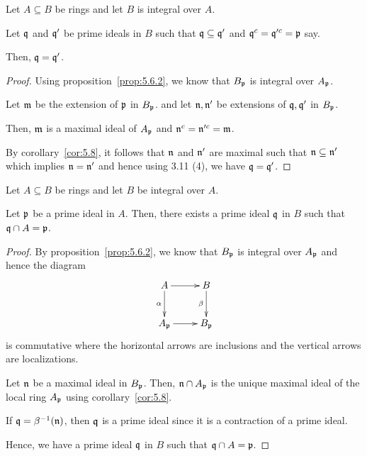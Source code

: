 \begin{corollary}{}{}
	Let \(A \subseteq B\) be rings and let \(B\) is integral over \(A\).

	Let \(\mathfrak{q}\) and \(\mathfrak{q}'\) be prime ideals in \(B\) such that
	\(\mathfrak{q} \subseteq \mathfrak{q}'\) and \(\mathfrak{q}^c = \mathfrak{q}'^c = \mathfrak{p}\) say.

	Then, \(\mathfrak{q} = \mathfrak{q}'\).
\end{corollary}
\begin{proof}
	Using proposition~\ref{prop:5.6.2}, we know that \(B_{\mathfrak{p}}\) is
	integral over \(A_{\mathfrak{p}}\).

	Let \(\mathfrak{m}\) be the extension of \(\mathfrak{p}\) in \(B_{\mathfrak{p}}\).
	and let \(\mathfrak{n}, \mathfrak{n}'\) be extensions of \(\mathfrak{q}, \mathfrak{q}'\) in
	\(B_{\mathfrak{p}}\).

	Then, \(\mathfrak{m}\) is a maximal ideal of \(A_{\mathfrak{p}}\) and
	\(\mathfrak{n}^c = \mathfrak{n}'^c = \mathfrak{m}\).

	By corollary~\ref{cor:5.8}, it follows that \(\mathfrak{n}\) and \(\mathfrak{n}'\)
	are maximal such that \(\mathfrak{n} \subseteq \mathfrak{n}'\) which implies
	\(\mathfrak{n} = \mathfrak{n}'\) and hence using 3.11 (4), we have
	\(\mathfrak{q} = \mathfrak{q}'\).
\end{proof}


\begin{theorem}{}{}
\label{thm:5.10}
	Let \(A \subseteq B\) be rings and let \(B\) be integral over \(A\).

	Let \(\mathfrak{p}\) be a prime ideal in \(A\).
	Then, there exists a prime ideal \(\mathfrak{q}\) in \(B\) such that
	\(\mathfrak{q} \cap A = \mathfrak{p}\).
\end{theorem}
\begin{proof}
	By proposition~\ref{prop:5.6.2}, we know that \(B_{\mathfrak{p}}\) is
	integral over \(A_{\mathfrak{p}}\) and hence the diagram
	\begin{align*}
		\xymatrix{
			A \ar[d]_-{\alpha} \ar[r]^-{} & B \ar[d]_-{\beta} \\
			A_{\mfp} \ar[r]_-{} & B_{\mfp}
		}
	\end{align*}
	is commutative where the horizontal arrows are inclusions and
	the vertical arrows are localizations.

	Let \(\mathfrak{n}\) be a maximal ideal in \(B_{\mathfrak{p}}\).
	Then, \(\mathfrak{n} \cap A_{\mathfrak{p}}\) is the unique maximal ideal
	of the local ring \(A_{\mathfrak{p}}\) using corollary~\ref{cor:5.8}.

	If \(\mathfrak{q} = \beta^{-1}(\mathfrak{n})\), then \(\mathfrak{q}\) is a prime ideal
	since it is a contraction of a prime ideal.

	Hence, we have a prime ideal \(\mathfrak{q}\) in \(B\) such that
	\(\mathfrak{q} \cap A = \mathfrak{p}\).
\end{proof}



